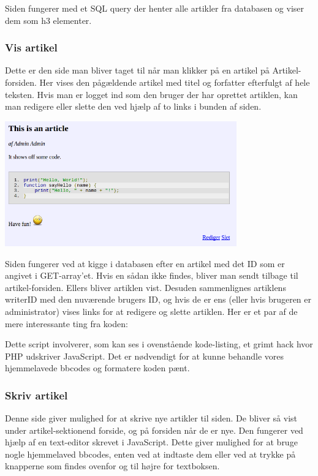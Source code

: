 \documentclass{article}
\begin{document}
Siden fungerer med et SQL query der henter alle artikler fra databasen og viser dem som h3 elementer.



\subsubsection{Vis artikel}
Dette er den side man bliver taget til når man klikker på en artikel på Artikel-forsiden. Her vises den pågældende artikel med titel og forfatter efterfulgt af hele teksten. Hvis man er logget ind som den bruger der har oprettet artiklen, kan man redigere eller slette den ved hjælp af to links i bunden af siden.

\includegraphics[width=100mm]{mi10.png}

Siden fungerer ved at kigge i databasen efter en artikel med det ID som er angivet i GET-array'et. Hvis en sådan ikke findes, bliver man sendt tilbage til artikel-forsiden. Ellers bliver artiklen vist. Desuden sammenlignes artiklens writerID med den nuværende brugers ID, og hvis de er ens (eller hvis brugeren er administrator) vises links for at redigere og slette artiklen. Her er et par af de mere interessante ting fra koden:



Dette script involverer, som kan ses i ovenstående kode-listing, et grimt hack hvor PHP udskriver JavaScript. Det er nødvendigt for at kunne behandle vores hjemmelavede bbcodes og formatere koden pænt.

\subsubsection{Skriv artikel}
Denne side giver mulighed for at skrive nye artikler til siden. De bliver så vist under artikel-sektionend forside, og på forsiden når de er nye. Den fungerer ved hjælp af en text-editor skrevet i JavaScript. Dette giver mulighed for at bruge nogle hjemmelaved bbcodes, enten ved at indtaste dem eller ved at trykke på knapperne som findes ovenfor og til højre for textboksen.
\end{document}
